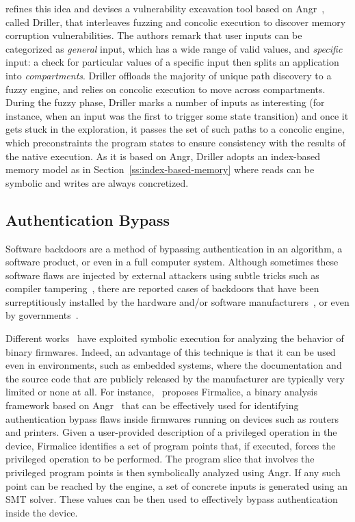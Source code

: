 \cite{DRILLER-NDSS16} refines this idea and devises a vulnerability excavation tool based on {\sc Angr}~\cite{ANGR-SSP16}, called Driller, that interleaves fuzzing and concolic execution to discover memory corruption vulnerabilities. The authors remark that user inputs can be categorized as {\em general} input, which has a wide range of valid values, and {\em specific} input: a check for particular values of a specific input then splits an application into {\em compartments}. Driller offloads the majority of unique path discovery to a fuzzy engine, and relies on concolic execution to move across compartments. During the fuzzy phase, Driller marks a number of inputs as interesting (for instance, when an input was the first to trigger some state transition) and once it gets stuck in the exploration, it passes the set of such paths to a concolic engine, which preconstraints the program states to ensure consistency with the results of the native execution. As it is based on {\sc Angr}, Driller adopts an index-based memory model as in Section~\ref{ss:index-based-memory} where reads can be symbolic and writes are always concretized. %

\subsection{Authentication Bypass}
\label{ss:auth-bypass}
Software backdoors are a method of bypassing authentication in an algorithm, a software product, or even in a full computer system. Although sometimes these software flaws are injected by external attackers using subtle tricks such as compiler tampering~\cite{KRS-TR74}, there are reported cases of backdoors that have been surreptitiously installed by the hardware and/or software manufacturers~\cite{CZF-USEC14}, or even by governments~\cite{NSA-BACKDOOR}. 

Different works~\cite{DMR-USEC13,ZBF-NDSS14,FIRMALICE-NDSS15} have exploited symbolic execution for analyzing the behavior of binary firmwares. Indeed, an advantage of this technique is that it can be used even in environments, such as embedded systems, where the documentation and the source code that are publicly released by the manufacturer are typically very limited or none at all. For instance,~\cite{FIRMALICE-NDSS15} proposes Firmalice, a binary analysis framework based on {\sc Angr}~\cite{ANGR-SSP16} that can be effectively used for identifying authentication bypass flaws inside firmwares running on devices such as routers and printers. Given a user-provided description of a privileged operation in the device, Firmalice identifies a set of program points that, if executed, forces the privileged operation to be performed. The program slice that involves the privileged program points is then symbolically analyzed using {\sc Angr}. If any such point can be reached by the engine, a set of concrete inputs is generated using an SMT solver. These values can be then used to effectively bypass authentication inside the device.

